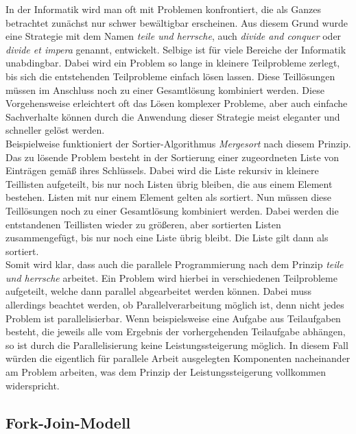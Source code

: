 			In der Informatik wird man oft mit Problemen konfrontiert, die als Ganzes betrachtet zunächst nur schwer bewältigbar erscheinen. Aus diesem Grund wurde eine Strategie mit dem Namen \textit{teile und herrsche}, auch \textit{divide and conquer} oder \textit{divide et impera} genannt, entwickelt. Selbige ist für viele Bereiche der Informatik unabdingbar. Dabei wird ein Problem so lange in kleinere Teilprobleme zerlegt, bis sich die entstehenden Teilprobleme einfach lösen lassen. Diese Teillösungen müssen im Anschluss noch zu einer Gesamtlösung kombiniert werden. Diese Vorgehensweise erleichtert oft das Lösen komplexer Probleme, aber auch einfache Sachverhalte können durch die Anwendung dieser Strategie meist eleganter und schneller gelöst werden. \cite{TeileUndHerrsche}\\
			Beispielweise funktioniert der Sortier-Algorithmus \textit{Mergesort} nach diesem Prinzip. Das zu lösende Problem besteht in der Sortierung einer zugeordneten Liste von Einträgen gemäß ihres Schlüssels. Dabei wird die Liste rekursiv in kleinere Teillisten aufgeteilt, bis nur noch Listen übrig bleiben, die aus einem Element bestehen. Listen mit nur einem Element gelten als sortiert. Nun müssen diese Teillösungen noch zu einer Gesamtlösung kombiniert werden. Dabei werden die entstandenen Teillisten wieder zu größeren, aber sortierten Listen zusammengefügt, bis nur noch eine Liste übrig bleibt. Die Liste gilt dann als sortiert. \cite{EinfacheSortierverfahren}\\
			Somit wird klar, dass auch die parallele Programmierung nach dem Prinzip \textit{teile und herrsche} arbeitet. Ein Problem wird hierbei in verschiedenen Teilprobleme aufgeteilt, welche dann parallel abgearbeitet werden können. Dabei muss allerdings beachtet werden, ob Parallelverarbeitung möglich ist, denn nicht jedes Problem ist parallelisierbar. Wenn beispielsweise eine Aufgabe aus Teilaufgaben besteht, die jeweils alle vom Ergebnis der vorhergehenden Teilaufgabe abhängen, so ist durch die Parallelisierung keine Leistungssteigerung möglich. In diesem Fall würden die eigentlich für parallele Arbeit ausgelegten Komponenten nacheinander am Problem arbeiten, was dem Prinzip der Leistungssteigerung vollkommen widerspricht.

		\subsection{Fork-Join-Modell}
			\label{ForkJoinModell}
			
